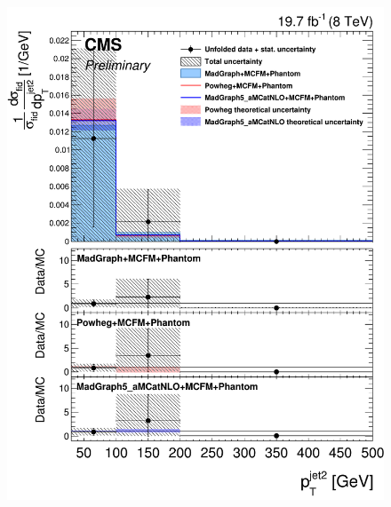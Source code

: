 \begin{figure}[hbtp]
\begin{center}
    \includegraphics[width=\cmsFigWidth]{Figures/DiffCrossSecZZTo2e2mPtJet2_Unfolded_fr_MadGraph_norm.png}       

\end{center}
\end{figure}
